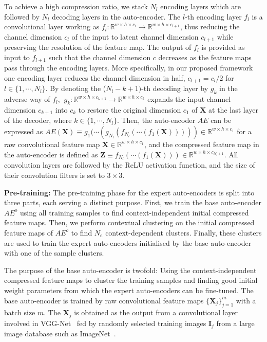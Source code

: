 \documentclass[10pt,twocolumn,letterpaper]{article}
\begin{document}
To achieve a high compression ratio, we stack $N_l$ encoding layers which are followed by $N_l$ decoding layers in the auto-encoder.
The $l$-th encoding layer $f_l$ is a convolutional layer working as $f_l: \mathbb{R}^{w\times h\times c_l} \rightarrow \mathbb{R}^{w\times h \times c_{l+1}}$, thus reducing the channel dimension $c_l$ of the input to latent channel dimension $c_{l+1}$ while preserving the resolution of the feature map.
The output of $f_l$ is provided as input to $f_{l+1}$ such that the channel dimension $c$ decreases as the feature maps pass through the encoding layers.
More specifically, in our proposed framework one encoding layer reduces the channel dimension in half, \ie $c_{l+1}=c_l/2$ for $l\in\{1,\cdots,N_l\}$.
By denoting the ($N_l-k+1)$-th decoding layer by $g_k$ in the adverse way of $f_l$, $~g_k: \mathbb{R}^{w\times h\times c_{k+1}} \rightarrow \mathbb{R}^{w\times h \times c_k}$ expands the input channel dimension $c_{k+1}$ into $c_k$ to restore the original dimension $c_1$ of $\mathbf{X}$ at the last layer of the decoder, where $k\in\{1,\cdots,N_l\}$. 
Then, the auto-encoder $AE$ can be expressed as $AE(\mathbf{X}) \equiv g_1(\cdots (g_{N_l}(f_{N_l}(\cdots(f_1(\mathbf{X})))))\in\mathbb{R}^{w\times h\times c_1}$ for a raw convolutional feature map
$\mathbf{X}\in\mathbb{R}^{w\times h\times c_1}$, and the compressed feature map in the auto-encoder is defined as $\mathbf{Z}\equiv f_{N_l}(\cdots(f_1(\mathbf{X})))\in\mathbb{R}^{w\times h\times c_{N_l+1}}$.
All convolution layers are followed by the ReLU activation function, and the size of their convolution filters is set to $3\times 3$.


\textbf{Pre-training:}
The pre-training phase for the expert auto-encoders is split into three parts, each serving a distinct purpose. 
First, we train the base auto-encoder $AE^o$ using all training samples to find context-independent initial compressed feature maps. 
Then, we perform contextual clustering on the initial compressed feature maps of $AE^o$ to find $N_e$ context-dependent clusters. Finally, these clusters are used to train the expert auto-encoders initialised by the base auto-encoder with one of the sample clusters. 

The purpose of the base auto-encoder is twofold: Using the context-independent compressed feature maps to cluster the training samples and finding good initial weight parameters from which the expert auto-encoders can be fine-tuned.
The base auto-encoder is trained by 
raw convolutional feature maps $\{ \mathbf{X}_j \}_{j=1}^m$ with a batch size $m$.
The $\mathbf{X}_j$ is obtained as the output from a convolutional layer involved in VGG-Net~\cite{ref:vggm} fed by randomly selected training images $\mathbf{I}_j$ from a large image database such as ImageNet~\cite{ref:ImageNet}.
\end{document}
